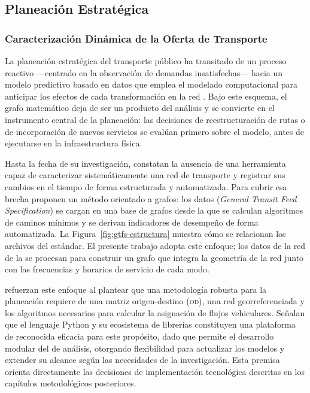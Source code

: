 
\subsection{Planeación Estratégica}
\label{subsec:planeacion-estrategica}

\subsubsection{Caracterización Dinámica de la Oferta de Transporte}
\label{subsubsec:caracterizacion-dinamica}

La planeación estratégica del transporte público ha transitado de un proceso
reactivo ---centrado en la observación de demandas insatisfechas--- hacia un
modelo predictivo basado en datos que emplea el modelado computacional para
anticipar los efectos de cada transformación en la red
\citep{fortin2016innovative}. Bajo este esquema, el grafo matemático deja de ser
un producto del análisis y se convierte en el instrumento central de la
planeación: las decisiones de reestructuración de rutas o de incorporación de
nuevos servicios se evalúan primero sobre el modelo, antes de ejecutarse en la
infraestructura física.

Hasta la fecha de su investigación, \citet{fortin2016innovative} constatan la
ausencia de una herramienta capaz de caracterizar sistemáticamente una red de
transporte y registrar sus cambios en el tiempo de forma estructurada y
automatizada. Para cubrir esa brecha proponen un método orientado a grafos: los
datos \gtfs{} (\textit{General Transit Feed Specification}) se cargan en una
base de grafos desde la que se calculan algoritmos de caminos mínimos y se
derivan indicadores de desempeño de forma automatizada. La
Figura~\ref{fig:gtfs-estructura} muestra cómo se relacionan los archivos del
estándar. El presente trabajo
adopta este enfoque; los datos \gtfs{} de la red de la \zmvm{} se procesan para
construir un grafo que integra la geometría de la red junto con las frecuencias
y horarios de servicio de cada modo.

\citet{moreno2023} refuerzan este enfoque al plantear que una metodología
robusta para la planeación requiere de una matriz origen-destino (\textsc{od}),
una red georreferenciada y los algoritmos necesarios para calcular la asignación
de flujos vehiculares. Señalan que el lenguaje Python y su ecosistema de
librerías constituyen una plataforma de reconocida eficacia para este propósito,
dado que permite el desarrollo modular del  de análisis, otorgando
flexibilidad para actualizar los modelos y extender su alcance según las
necesidades de la investigación. Esta premisa orienta directamente las
decisiones de implementación tecnológica descritas en los capítulos
metodológicos posteriores.

